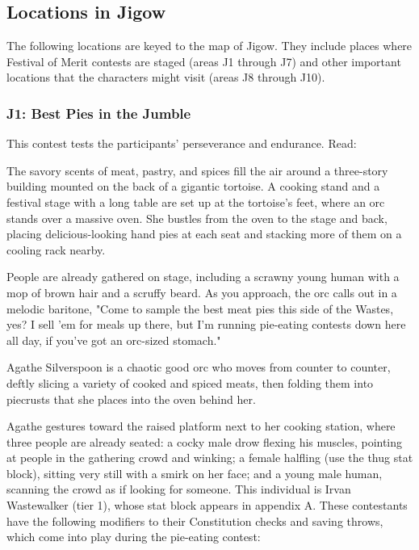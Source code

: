 \documentclass[10pt,a4paper,twoside,bg=print,twocolumn,openany,nodeprecatedcode]{dndbook}
\begin{document}
\subsection{Locations in Jigow}
The following locations are keyed to the map of Jigow. They include places where Festival of Merit contests are staged (areas J1 through J7) and other important locations that the characters might visit (areas J8 through J10).

\subsubsection{J1: Best Pies in the Jumble}
This contest tests the participants' perseverance and endurance. Read:

\begin{DndReadAloud}{}
The savory scents of meat, pastry, and spices fill the air around a three-story building mounted on the back of a gigantic tortoise. A cooking stand and a festival stage with a long table are set up at the tortoise's feet, where an orc stands over a massive oven. She bustles from the oven to the stage and back, placing delicious-looking hand pies at each seat and stacking more of them on a cooling rack nearby.

People are already gathered on stage, including a scrawny young human with a mop of brown hair and a scruffy beard. As you approach, the orc calls out in a melodic baritone, "Come to sample the best meat pies this side of the Wastes, yes? I sell 'em for meals up there, but I'm running pie-eating contests down here all day, if you've got an orc-sized stomach."

\end{DndReadAloud}

Agathe Silverspoon is a chaotic good orc who moves from counter to counter, deftly slicing a variety of cooked and spiced meats, then folding them into piecrusts that she places into the oven behind her.

Agathe gestures toward the raised platform next to her cooking station, where three people are already seated: a cocky male drow flexing his muscles, pointing at people in the gathering crowd and winking; a female halfling (use the thug stat block), sitting very still with a smirk on her face; and a young male human, scanning the crowd as if looking for someone. This individual is Irvan Wastewalker (tier 1), whose stat block appears in appendix A. These contestants have the following modifiers to their Constitution checks and saving throws, which come into play during the pie-eating contest:
\end{document}
